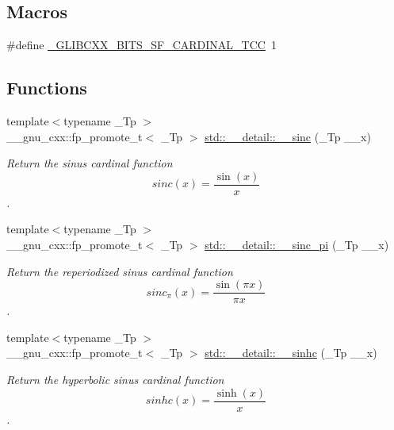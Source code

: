 \subsection*{Macros}
\begin{DoxyCompactItemize}
\item 
\#define \hyperlink{sf__cardinal_8tcc_a1e9bb8201f62b2303ba941ea920790b6}{\+\_\+\+G\+L\+I\+B\+C\+X\+X\+\_\+\+B\+I\+T\+S\+\_\+\+S\+F\+\_\+\+C\+A\+R\+D\+I\+N\+A\+L\+\_\+\+T\+CC}~1
\end{DoxyCompactItemize}
\subsection*{Functions}
\begin{DoxyCompactItemize}
\item 
{\footnotesize template$<$typename \+\_\+\+Tp $>$ }\\\+\_\+\+\_\+gnu\+\_\+cxx\+::fp\+\_\+promote\+\_\+t$<$ \+\_\+\+Tp $>$ \hyperlink{namespacestd_1_1____detail_ad0730b2b26df36cc8876a1152d895523}{std\+::\+\_\+\+\_\+detail\+::\+\_\+\+\_\+sinc} (\+\_\+\+Tp \+\_\+\+\_\+x)
\begin{DoxyCompactList}\small\item\em Return the sinus cardinal function \[ sinc(x) = \frac{\sin(x)}{x} \]. \end{DoxyCompactList}\item 
{\footnotesize template$<$typename \+\_\+\+Tp $>$ }\\\+\_\+\+\_\+gnu\+\_\+cxx\+::fp\+\_\+promote\+\_\+t$<$ \+\_\+\+Tp $>$ \hyperlink{namespacestd_1_1____detail_ae73746d4ab5c5087c5d302e428490396}{std\+::\+\_\+\+\_\+detail\+::\+\_\+\+\_\+sinc\+\_\+pi} (\+\_\+\+Tp \+\_\+\+\_\+x)
\begin{DoxyCompactList}\small\item\em Return the reperiodized sinus cardinal function \[ sinc_\pi(x) = \frac{\sin(\pi x)}{\pi x} \]. \end{DoxyCompactList}\item 
{\footnotesize template$<$typename \+\_\+\+Tp $>$ }\\\+\_\+\+\_\+gnu\+\_\+cxx\+::fp\+\_\+promote\+\_\+t$<$ \+\_\+\+Tp $>$ \hyperlink{namespacestd_1_1____detail_a65db661ebfae979e916e2f4481e6866c}{std\+::\+\_\+\+\_\+detail\+::\+\_\+\+\_\+sinhc} (\+\_\+\+Tp \+\_\+\+\_\+x)
\begin{DoxyCompactList}\small\item\em Return the hyperbolic sinus cardinal function \[ sinhc(x) = \frac{\sinh(x)}{x} \]. \end{DoxyCompactList}\item 

\end{DoxyCompactItemize}
